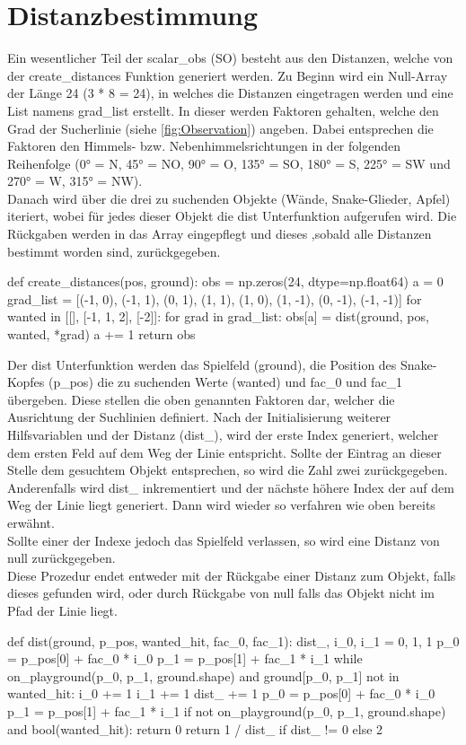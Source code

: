 \section{Distanzbestimmung} \label{sec:Anhang-Implementierung-Distanzen}
Ein wesentlicher Teil der scalar\_obs (SO) besteht aus den Distanzen, welche von der create\_distances Funktion generiert werden. Zu Beginn wird ein Null-Array der Länge 24 (3 * 8 = 24), in welches die Distanzen eingetragen werden und eine List namens grad\_list erstellt. In dieser werden Faktoren gehalten, welche den Grad der Sucherlinie (siehe \ref{fig:Observation}) angeben. Dabei entsprechen die Faktoren den Himmels- bzw. Nebenhimmelsrichtungen in der folgenden Reihenfolge (0° = N, 45° = NO, 90° = O, 135° = SO, 180° = S, 225° = SW und 270° = W, 315° = NW).\\
Danach wird über die drei zu suchenden Objekte (Wände, Snake-Glieder, Apfel) iteriert, wobei für jedes dieser Objekt die dist Unterfunktion aufgerufen wird. Die Rückgaben werden in das Array eingepflegt und dieses ,sobald alle Distanzen bestimmt worden sind, zurückgegeben.
\begin{python}
	def create_distances(pos, ground):
		obs = np.zeros(24, dtype=np.float64)
		a = 0
		grad_list = [(-1, 0), (-1, 1), (0, 1), (1, 1), (1, 0), (1, -1), (0, -1), (-1, -1)]
		for wanted in [[], [-1, 1, 2], [-2]]:
			for grad in grad_list:
				obs[a] = dist(ground, pos, wanted, *grad)
				a += 1
		return obs
\end{python}
Der dist Unterfunktion werden das Spielfeld (ground), die Position des Snake-Kopfes (p\_pos) die zu suchenden Werte (wanted) und fac\_0 und fac\_1 übergeben. Diese stellen die oben genannten Faktoren dar, welcher die Ausrichtung der Suchlinien definiert.
Nach der Initialisierung weiterer Hilfsvariablen und der Distanz (dist\_), wird der erste Index generiert, welcher dem ersten Feld auf dem Weg der Linie entspricht. Sollte der Eintrag an dieser Stelle dem gesuchtem Objekt entsprechen, so wird die Zahl zwei zurückgegeben. Anderenfalls wird dist\_ inkrementiert und der nächste höhere Index der auf dem Weg der Linie liegt generiert. Dann wird wieder so verfahren wie oben bereits erwähnt.\\
Sollte einer der Indexe jedoch das Spielfeld verlassen, so wird eine Distanz von null zurückgegeben.\\
Diese Prozedur endet entweder mit der Rückgabe einer Distanz zum Objekt, falls dieses gefunden wird, oder durch Rückgabe von null falls das Objekt nicht im Pfad der Linie liegt. 
\begin{python}
	def dist(ground, p_pos, wanted_hit, fac_0, fac_1):
		dist_, i_0, i_1 = 0, 1, 1
		p_0 = p_pos[0] + fac_0 * i_0
		p_1 = p_pos[1] + fac_1 * i_1
		while on_playground(p_0, p_1, ground.shape) and ground[p_0, p_1] not in wanted_hit:
			i_0 += 1
			i_1 += 1
			dist_ += 1
			p_0 = p_pos[0] + fac_0 * i_0
			p_1 = p_pos[1] + fac_1 * i_1
		if not on_playground(p_0, p_1, ground.shape) and bool(wanted_hit):
			return 0
		return 1 / dist_ if dist_ != 0 else 2
\end{python} 

